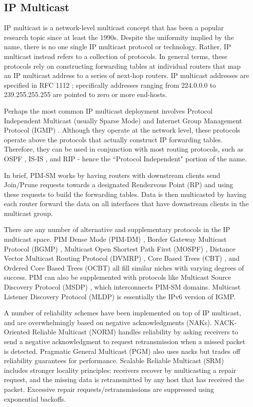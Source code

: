 \subsection{IP Multicast}
IP multicast is a network-level multicast concept that has been a popular research topic since at least the 1990s. Despite the uniformity implied by the name, there is no one single IP multicast protocol or technology. Rather, IP multicast instead refers to a collection of protocols. In general terms, these protocols rely on constructing forwarding tables at individual routers that map an IP multicast address to a series of next-hop routers. IP multicast addresses are specified in RFC 1112 \cite{RFC1112}; specifically addresses ranging from 224.0.0.0 to 239.255.255.255 are pointed to zero or more end-hosts.

Perhaps the most common IP multicast deployment involves Protocol Independent Multicast (usually Sparse Mode) \cite{RFC2362} and Internet Group Management Protocol (IGMP) \cite{RFC4605}. Although they operate at the network level, these protocols operate above the protocols that actually construct IP forwarding tables. Therefore, they can be used in conjunction with most routing protocols, such as OSPF \cite{RFC2328}, IS-IS \cite{ISO10589}, and RIP \cite{RFC2453} - hence the ``Protocol Independent" portion of the name. 

In brief, PIM-SM works by having routers with downstream clients send Join/Prune requests towards a designated Rendezvous Point (RP) and using these requests to build the forwarding tables. Data is then multicasted by having each router forward the data on all interfaces that have downstream clients in the multicast group.

There are any number of alternative and supplementary protocols in the IP multicast space. PIM Dense Mode (PIM-DM) \cite{RFC3973}, Border Gateway Multicast Protocol (BGMP) \cite{RFC3913}, Multicast Open Shortest Path First (MOSPF) \cite{RFC1584}, Distance Vector Multicast Routing Protocol (DVMRP) \cite{RFC1075}, Core Based Trees (CBT) \cite{RFC2201}, and Ordered Core Based Trees (OCBT) \cite{OCBT} all fill similar niches with varying degrees of success.  PIM can also be supplemented with protocols like Multicast Source Discovery Protocol (MSDP) \cite{RFC4611}, which interconnects PIM-SM domains. Multicast Listener Discovery Protocol (MLDP) \cite{RFC4604} is essentially the IPv6 version of IGMP.

A number of reliability schemes have been implemented on top of IP multicast, and are overwhelmingly based on negative acknowledgments (NAKs). NACK-Oriented Reliable Multicast (NORM) \cite{RFC5740} handles reliability by asking receivers to send a negative acknowledgment to request retransmission when a missed packet is detected. Pragmatic General Multicast (PGM) \cite{RFC3208} also uses nacks but trades off reliability guarantees for performance. Scalable Reliable Multicast (SRM) \cite{SRM} includes stronger locality principles: receivers recover by multicasting a repair request, and the missing data is retransmitted by any host that has received the packet.  Excessive repair requests/retransmissions are suppressed using exponential backoffs.

